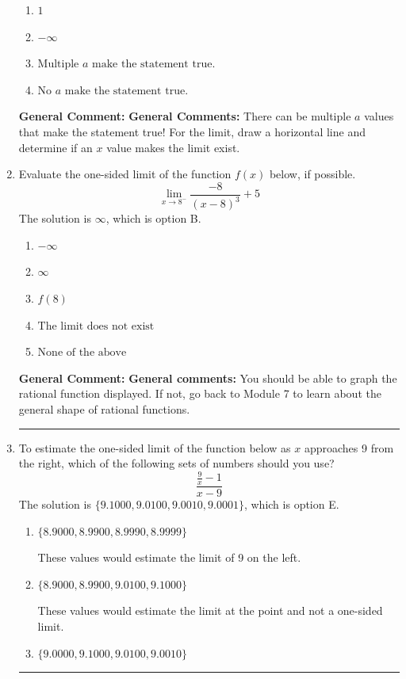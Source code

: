 \documentclass{extbook}[14pt]
\newcommand{\litem}[1]{\item #1

\rule{\textwidth}{0.4pt}}
\begin{document}
\begin{enumerate}
{\begin{enumerate}[label=\Alph*.]
\item \( 1 \)


\item \( -\infty \)


\item \( \text{Multiple } a \text{ make the statement true}. \)


\item \( \text{No } a \text{ make the statement true}. \)


\end{enumerate}

\textbf{General Comment:} \textbf{General Comments:} There can be multiple $a$ values that make the statement true! For the limit, draw a horizontal line and determine if an $x$ value makes the limit exist.
}
\litem{
Evaluate the one-sided limit of the function $f(x)$ below, if possible.
\[ \lim_{x \rightarrow 8^-} \frac{-8}{(x-8)^3}+5 \]The solution is \( \infty \), which is option B.\begin{enumerate}[label=\Alph*.]
\item \( -\infty \)


\item \( \infty \)


\item \( f(8) \)


\item \( \text{The limit does not exist} \)


\item \( \text{None of the above} \)


\end{enumerate}

\textbf{General Comment:} \textbf{General comments:} You should be able to graph the rational function displayed. If not, go back to Module 7 to learn about the general shape of rational functions.
}
\litem{
To estimate the one-sided limit of the function below as $x$ approaches 9 from the right, which of the following sets of numbers should you use?
\[ \frac{\frac{9}{x} - 1}{x - 9} \]The solution is \( \{ 9.1000, 9.0100, 9.0010, 9.0001 \} \), which is option E.\begin{enumerate}[label=\Alph*.]
\item \( \{ 8.9000, 8.9900, 8.9990, 8.9999 \} \)

These values would estimate the limit of 9 on the left.
\item \( \{ 8.9000, 8.9900, 9.0100, 9.1000 \} \)

These values would estimate the limit at the point and not a one-sided limit.
\item \( \{ 9.0000, 9.1000, 9.0100, 9.0010 \} \)


\end{enumerate}}
\end{enumerate}
\end{document}
